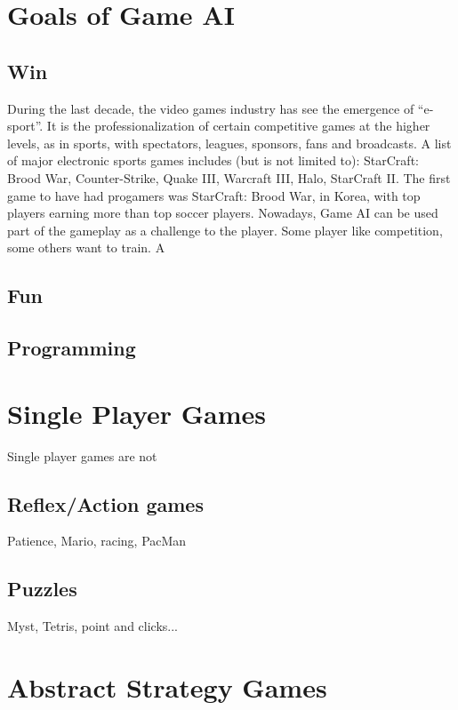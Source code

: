 \section{Goals of Game AI}

\subsection{Win}
During the last decade, the video games industry has see the emergence of ``e-sport''. It is the professionalization of certain competitive games at the higher levels, as in sports, with spectators, leagues, sponsors, fans and broadcasts. A %
list of major electronic sports games includes (but is not limited to): StarCraft: Brood War, Counter-Strike, Quake III, Warcraft III, Halo, StarCraft II. The first game to have had progamers was StarCraft: Brood War, in Korea, with top players earning more than top soccer players. Nowadays,
Game AI can be used part of the gameplay as a challenge to the player. Some player like competition, some others want to train. A


\subsection{Fun}

\subsection{Programming}

\section{Single Player Games}
Single player games are not
\subsection{Reflex/Action games}
Patience, Mario, racing, PacMan
\subsection{Puzzles}
Myst, Tetris, point and clicks...

\section{Abstract Strategy Games}
